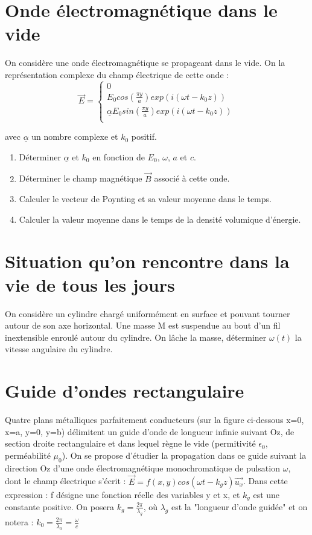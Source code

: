 \documentclass{article}
\begin{document}
\section{Onde électromagnétique dans le vide}

On considère une onde électromagnétique se propageant dans le vide. On la représentation complexe du champ électrique de cette onde : \\



\[
\vec{E} = \left\{
\begin{array}{l}
0 \\
E_0 cos(\frac{\pi y }{a}) exp(i(\omega t - k_0 z)) \\
\underline{\alpha} E_0 sin (\frac{\pi y}{a}) exp(i(\omega t - k_0 z)) \\
\end{array}
\right.
\]

avec $\underline{\alpha}$ un nombre complexe et $k_0$ positif. 

\begin{enumerate}
  \item Déterminer $\underline{\alpha}$ et $k_0$ en fonction de $E_0$, $\omega$, $a$ et $c$. 
  \item Déterminer le champ magnétique $\vec{B}$ associé à cette onde. 
  \item Calculer le vecteur de Poynting et sa valeur moyenne dans le temps. 
  \item Calculer la valeur moyenne dans le temps de la densité volumique d'énergie. 
\end{enumerate}

\section{Situation qu'on rencontre dans la vie de tous les jours}

On considère un cylindre chargé uniformément en surface et pouvant tourner autour de son axe horizontal. 
Une masse M est suspendue au bout d'un fil inextensible enroulé autour du cylindre. 
On lâche la masse, déterminer $\omega(t)$ la vitesse angulaire du cylindre. \\[2cm]


\section{Guide d'ondes rectangulaire}
Quatre plans métalliques parfaitement conducteurs (sur la figure ci-dessous x=0, x=a, y=0,
y=b) délimitent un guide d’onde de longueur infinie suivant Oz, de section droite rectangulaire et dans lequel règne le vide (permitivité $\epsilon_0$, perméabilité $\mu_0$).
On se propose d’étudier la propagation dans ce guide suivant la direction Oz d’une onde
électromagnétique monochromatique de pulsation $\omega$, dont le champ électrique s’écrit :
$\vec{E}=f(x,y)cos(\omega t-k_g z)\vec{u_x}$. Dans cette expression : f désigne une fonction réelle des 
variables y et x, et $ k_g$ est une constante positive. On posera $k_g=\frac{2\pi}{\lambda_g}$, où $\lambda_g$ est  la  "longueur d’onde
guidée" et on notera : $k_0 = \frac{2\pi}{\lambda_0}=\frac{\omega}{c}$
\end{document}
